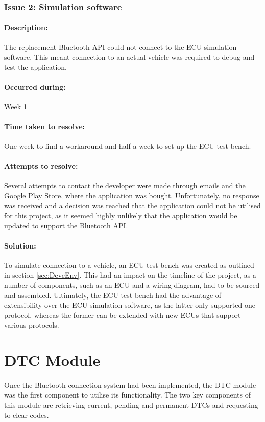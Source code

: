 		\subsubsection{Issue 2: Simulation software}{
			\paragraph{Description:}
			The replacement Bluetooth API could not connect to the ECU simulation software. This meant connection to an actual vehicle was required to debug and test the application.
			
			\paragraph{Occurred during:}
			Week 1
			\paragraph{Time taken to resolve:}
			One week to find a workaround and half a week to set up the ECU test bench.
			\paragraph{Attempts to resolve:}
			Several attempts to contact the developer were made through emails and the Google Play Store, where the application was bought. Unfortunately, no response was received and a decision was reached that the application could not be utilised for this project, as it seemed highly unlikely that the application would be updated to support the Bluetooth API. 
			\paragraph{Solution:}
			To simulate connection to a vehicle, an ECU test bench was created as outlined in section \ref{sec:DeveEnv}. This had an impact on the timeline of the project, as a number of components, such as an ECU and a wiring diagram, had to be sourced and assembled. Ultimately, the ECU test bench had the advantage of extensibility over the ECU simulation software, as the latter only supported one protocol, whereas the former can be extended with new ECUs that support various protocols.
		}
		\label{ssec:SimSoftware}		

\section{DTC Module}
	\paragraph{}{
	Once the Bluetooth connection system had been implemented, the DTC module was the first component to utilise its functionality. The two key components of this module are retrieving current, pending and permanent DTCs and requesting to clear codes.
	}
